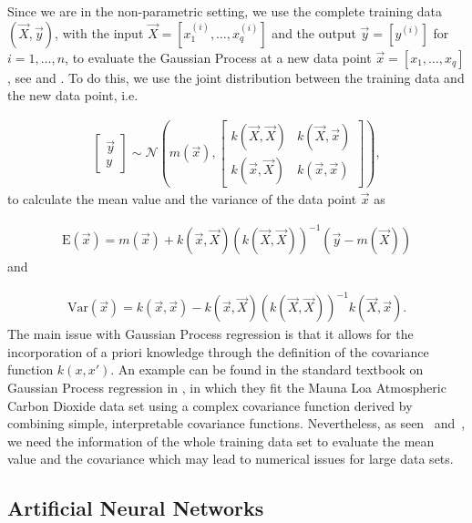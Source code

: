 Since we are in the non-parametric setting, we use the complete training data $(\vec{X}, \vec{y})$, with the input $\vec{X} = [x_1^{(i)}, \dots, x_q^{(i)}]$ and the output $\vec{y} = [y^{(i)}]$ for $i=1, \dots, n$,  to evaluate the Gaussian Process at a new data point $\vec{x} = [x_1, \dots, x_q]$, see \cite{bergmann2019gaussprozessregression} and \cite{rasmussen2005GPforML}. To do this, we use the joint distribution between the training data and the new data point, i.e.

\begin{align}
	\begin{bmatrix}
		\vec{y} \\ y 
	\end{bmatrix} \sim \mathcal{N} \left( m(\vec{x}), \begin{bmatrix} k(\vec{X}, \vec{X}) & k(\vec{X}, \vec{x}) \\
																		 k(\vec{x}, \vec{X}) & k(\vec{x}, \vec{x}) 
														\end{bmatrix} \right),
\end{align} 
%
to calculate the mean value and the variance of the data point $\vec{x}$ as

\begin{align} \label{eq:GP-mean}
	\text{E}(\vec{x}) = m(\vec{x}) + k(\vec{x}, \vec{X}) (k(\vec{X}, \vec{X}))^{-1} (\vec{y} - m(\vec{X}))
\end{align}
%
and

\begin{align} \label{eq:GP-var}
	\text{Var}(\vec{x})  = k(\vec{x}, \vec{x}) - k(\vec{x}, \vec{X}) (k(\vec{X}, \vec{X}))^{-1}k(\vec{X}, \vec{x}).
\end{align}
%
The main issue with Gaussian Process regression is that it allows for the incorporation of a priori knowledge through the definition of the covariance function $k(x,x')$. An example can be found in the standard textbook on Gaussian Process regression in \cite{rasmussen2005GPforML}, in which they fit the Mauna Loa Atmospheric Carbon Dioxide data set using a complex covariance function derived by combining simple, interpretable covariance functions.  Nevertheless, as seen~ and~, we need the information of the whole training data set to evaluate the mean value and the covariance which may lead to numerical issues for large data sets. 


\subsection{Artificial Neural Networks}

